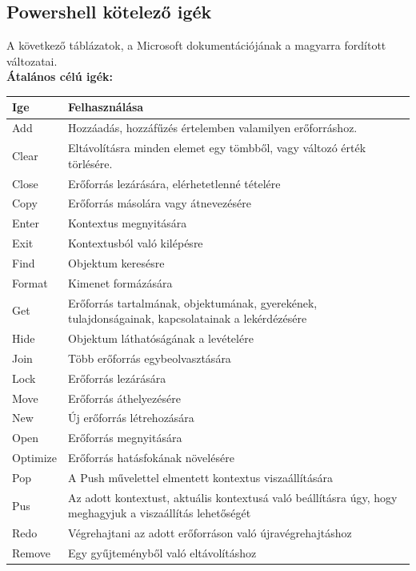 \documentclass[12pt,oneside,justify,table]{book}
\begin{document}
\begin{appendices}
\chapter{Powershell kötelező igék}
\label{appendix:powershellRequiredVerbs}
A következő táblázatok, a Microsoft dokumentációjának a magyarra fordított változatai. \cite{PowerShellGuidelines} \\
\textbf{Átalános célú igék:} \cite{VerbsCommon}\\
\begin{tabularx}{\linewidth}{l|X}
\rowcolor{blue!50}
\textbf{Ige} & \textbf{Felhasználása} \\
\hline
Add & Hozzáadás, hozzáfűzés értelemben valamilyen erőforráshoz. \\
Clear & Eltávolításra minden elemet egy tömbből, vagy változó érték törlésére. \\
Close & Erőforrás lezárására, elérhetetlenné tételére \\
Copy & Erőforrás másolára vagy átnevezésére \\
Enter & Kontextus megnyitására \\
Exit & Kontextusból való kilépésre \\
Find & Objektum keresésre \\
Format & Kimenet formázására \\
Get & Erőforrás tartalmának, objektumának, gyerekének, tulajdonságainak, kapcsolatainak a lekérdézésére \\
Hide & Objektum láthatóságának a levételére \\
Join & Több erőforrás egybeolvasztására \\
Lock & Erőforrás lezárására \\
Move & Erőforrás áthelyezésére \\
New & Új erőforrás létrehozására \\
Open & Erőforrás megnyitására \\
Optimize & Erőforrás hatásfokának növelésére \\
Pop & A Push művelettel elmentett kontextus viszaállítására \\ 
Pus & Az adott kontextust, aktuális kontextusá való beállításra úgy, hogy meghagyjuk a viszaállítás lehetőségét \\
Redo & Végrehajtani az adott erőforráson való újravégrehajtáshoz \\
Remove & Egy gyűjteményből való eltávolításhoz \\

\end{tabularx}
\end{appendices}
\end{document}
